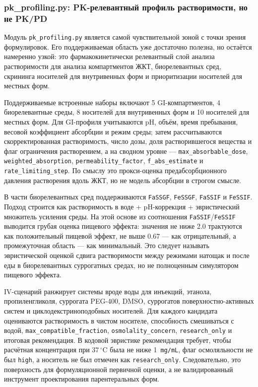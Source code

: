 \documentclass[11pt]{article}
\begin{document}
\subsubsection{pk\_profiling.py: PK-релевантный профиль растворимости, но не PK/PD}

Модуль \texttt{pk\_profiling.py} является самой чувствительной зоной с точки зрения формулировок. Его поддерживаемая область уже достаточно полезна, но остаётся намеренно узкой: это фармакокинетически релевантный слой анализа растворимости для анализа компартментов ЖКТ, биорелевантных сред, скрининга носителей для внутривенных форм и приоритизации носителей для местных форм.

Поддерживаемые встроенные наборы включают 5 GI-компартментов, 4 биорелевантные среды, 8 носителей для внутривенных форм и 10 носителей для местных форм. Для GI-профиля учитываются pH, объём, время пребывания, весовой коэффициент абсорбции и режим среды; затем рассчитываются скорректированная растворимость, число дозы, доля растворившегося вещества и флаг ограничения растворением, а на сводном уровне --- \texttt{max\_absorbable\_dose}, \texttt{weighted\_absorption}, \texttt{permeability\_factor}, \texttt{f\_abs\_estimate} и \texttt{rate\_limiting\_step}. По смыслу это прокси-оценка предабсорбционного давления растворения вдоль ЖКТ, но не модель абсорбции в строгом смысле.

В части биорелевантных сред поддерживаются \texttt{FaSSGF}, \texttt{FeSSGF}, \texttt{FaSSIF} и \texttt{FeSSIF}. Подход строится как растворимость в воде + pH-коррекция + эвристический множитель усиления среды. На этой основе из соотношения \texttt{FaSSIF}/\texttt{FeSSIF} выводится грубая оценка пищевого эффекта: значения не ниже 2.0 трактуются как положительный пищевой эффект, не выше 0.67 --- как отрицательный, а промежуточная область --- как минимальный. Это следует называть эвристической оценкой сдвига растворимости между режимами натощак и после еды в биорелевантных суррогатных средах, но не полноценным симулятором пищевого эффекта.

IV-сценарий ранжирует системы вроде воды для инъекций, этанола, пропиленгликоля, суррогата PEG-400, DMSO, суррогатов поверхностно-активных систем и циклодекстриноподобных носителей. Для каждого кандидата оцениваются растворимость в чистом носителе, способность смешиваться с водой, \texttt{max\_compatible\_fraction}, \texttt{osmolality\_concern}, \texttt{research\_only} и итоговая рекомендация. В кодовой эвристике рекомендация требует, чтобы расчётная концентрация при \(37\,^{\circ}\mathrm{C}\) была не ниже 1~\texttt{mg/mL}, флаг осмоляльности не был \texttt{high}, а носитель не был отмечен как \texttt{research\_only}. Следовательно, это поверхность для формуляционной первичной оценки, а не валидированный инструмент проектирования парентеральных форм.
\end{document}
